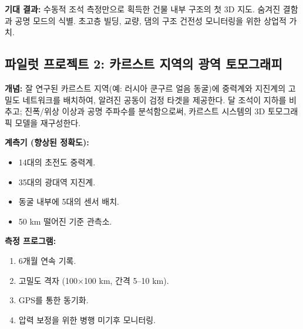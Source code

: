 \documentclass[12pt,a4paper]{article}
\theoremstyle{remark}
\begin{document}
	\textbf{기대 결과:} 수동적 조석 측정만으로 획득한 건물 내부 구조의 첫 3D 지도. 숨겨진 결함과 공명 모드의 식별. 초고층 빌딩, 교량, 댐의 구조 건전성 모니터링을 위한 상업적 가치.
	
	\subsection{파일럿 프로젝트 2: 카르스트 지역의 광역 토모그래피}
	
	\textbf{개념:} 잘 연구된 카르스트 지역(예: 러시아 쿤구르 얼음 동굴)에 중력계와 지진계의 고밀도 네트워크를 배치하여, 알려진 공동이 검정 타겟을 제공한다. 달 조석이 지하를 비추고; 진폭/위상 이상과 공명 주파수를 분석함으로써, 카르스트 시스템의 3D 토모그래픽 모델을 재구성한다.
	
	\textbf{계측기 (향상된 정확도):}
	\begin{itemize}
		\item 14대의 초전도 중력계.
		\item 35대의 광대역 지진계.
		\item 동굴 내부에 5대의 센서 배치.
		\item 50 km 떨어진 기준 관측소.
	\end{itemize}
	
	\textbf{측정 프로그램:}
	\begin{enumerate}
		\item 6개월 연속 기록.
		\item 고밀도 격자 (100$\times$100 km, 간격 5–10 km).
		\item GPS를 통한 동기화.
		\item 압력 보정을 위한 병행 미기후 모니터링.
	\end{enumerate}
	
\end{document}
